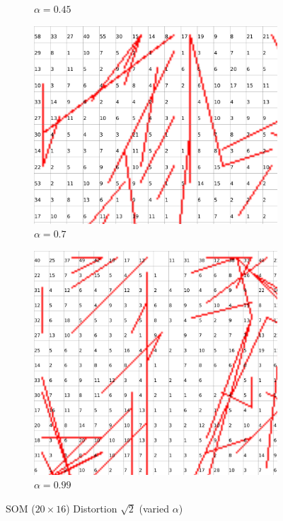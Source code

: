 \documentclass{acm_proc_article-sp}
\begin{document}
\begin{figure}
\begin{subfigure}[b]{0.24\linewidth}
        \caption{$\alpha=0.45$}
        \label{fig:wine-20x16-distortion-sqrt-2-alpha-0.45}
    \end{subfigure}
    \begin{subfigure}[b]{0.24\linewidth}
        \includegraphics[width=\linewidth]{img/wine-20x16-distortion-sqrt-2-alpha-0.7}
        \caption{$\alpha=0.7$}
        \label{fig:wine-20x16-distortion-sqrt-2-alpha-0.7}
    \end{subfigure}
    \begin{subfigure}[b]{0.24\linewidth}
        \includegraphics[width=\linewidth]{img/wine-20x16-distortion-sqrt-2-alpha-0.99}
        \caption{$\alpha=0.99$}
        \label{fig:wine-20x16-distortion-sqrt-2-alpha-0.99}
    \end{subfigure}
    \caption{SOM ($20\times16$) Distortion $\sqrt{2}$ (varied $\alpha$)}
    \label{fig:wine-20x16-distortion-sqrt-2-alpha}
\end{figure}
\end{document}
